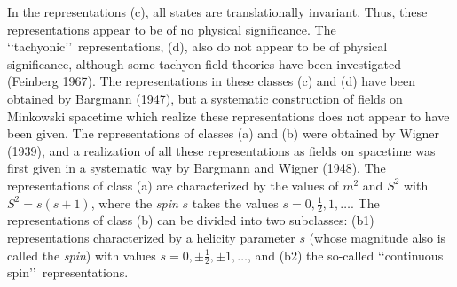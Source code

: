 In the representations (c), all states are translationally invariant. Thus, these
representations appear to be of no physical significance. The \lq\lq tachyonic\rq\rq\
representations, (d), also do not appear to be of physical significance, although
some tachyon field theories have been investigated (Feinberg 1967). The
representations in these classes (c) and (d) have been obtained by Bargmann (1947),
but a systematic construction of fields on Minkowski spacetime which realize these
representations does not appear to have been given. The representations of classes
(a) and (b) were obtained by Wigner (1939), and a realization of all these
representations as fields on spacetime was first given in a systematic way by
Bargmann and Wigner (1948). The representations of class (a) are characterized by
the values of \(m^2\) and \(S^2\) with \(S^2=s(s+1)\), where the \emph{spin} \(s\)
takes the values \(s=0,\tfrac12,1,\ldots\). The representations of class (b) can be
divided into two subclasses: (b1) representations characterized by a helicity
parameter \(s\) (whose magnitude also is called the \emph{spin}) with values
\(s=0,\pm\tfrac12,\pm1,\ldots\), and (b2) the so-called \lq\lq continuous
spin\rq\rq\ representations.

